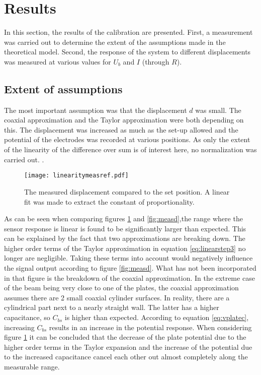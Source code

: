 \section{Results}
In this section, the results of the calibration are presented. First, a measurement was carried out to determine the extent of the assumptions made in the theoretical model. Second, the response of the system to different displacements was measured at various values for $U_b$ and $I$ (through $R$).

\subsection{Extent of assumptions}
The most important assumption was that the displacement $d$ was small. The coaxial approximation and the Taylor approximation were both depending on this. The displacement was increased as much as the set-up allowed and the potential of the electrodes was recorded at various positions. As only the extent of the linearity of the difference over sum is of interest here, no normalization was carried out.
.
\begin{figure}[h]
\centering
\texttt{[image: linearitymeasref.pdf]}
\caption{The measured displacement compared to the set position. A linear fit was made to extract the constant of proportionality.}
\label{fig:linearitymeas}
\end{figure}

As can be seen when comparing figures \ref{fig:linearitymeas} and \ref{fig:measd},the range where the sensor response is linear is found to be significantly larger than expected. This can be explained by the fact that two approximations are breaking down. The higher order terms of the Taylor approximation in equation \ref{eq:linearstep3} no longer are negligible. Taking these terms into account would negatively influence the signal output according to figure \ref{fig:measd}. What has not been incorporated in that figure is the breakdown of the coaxial approximation. In the extreme case of the beam being very close to one of the plates, the coaxial approximation assumes there are 2 small coaxial cylinder surfaces. In reality, there are a cylindrical part next to a nearly straight wall. The latter has a higher capacitance, so $C_{bs}$ is higher than expected. According to equation \ref{eq:vplatec}, increasing $C_{bs}$ results in an increase in the potential response. When considering figure \ref{fig:linearitymeas} it can be concluded that the decrease of the plate potential due to the higher order terms in the Taylor expansion and the increase of the potential due to the increased capacitance cancel each other out almost completely along the measurable range.

